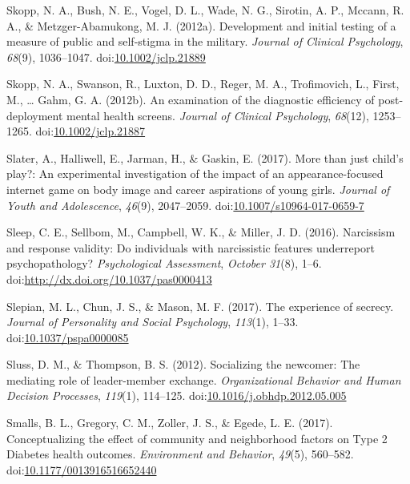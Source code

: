 \documentclass[english,man]{apa6}
\theoremstyle{definition}
\theoremstyle{definition}
\theoremstyle{definition}
\theoremstyle{remark}
\begin{document}
\hypertarget{ref-Skopp2012a}{}
Skopp, N. A., Bush, N. E., Vogel, D. L., Wade, N. G., Sirotin, A. P.,
Mccann, R. A., \& Metzger-Abamukong, M. J. (2012a). Development and
initial testing of a measure of public and self-stigma in the military.
\emph{Journal of Clinical Psychology}, \emph{68}(9), 1036--1047.
doi:\href{https://doi.org/10.1002/jclp.21889}{10.1002/jclp.21889}

\hypertarget{ref-Skopp2012}{}
Skopp, N. A., Swanson, R., Luxton, D. D., Reger, M. A., Trofimovich, L.,
First, M., \ldots{} Gahm, G. A. (2012b). An examination of the
diagnostic efficiency of post-deployment mental health screens.
\emph{Journal of Clinical Psychology}, \emph{68}(12), 1253--1265.
doi:\href{https://doi.org/10.1002/jclp.21887}{10.1002/jclp.21887}

\hypertarget{ref-Slater2017}{}
Slater, A., Halliwell, E., Jarman, H., \& Gaskin, E. (2017). More than
just child's play?: An experimental investigation of the impact of an
appearance-focused internet game on body image and career aspirations of
young girls. \emph{Journal of Youth and Adolescence}, \emph{46}(9),
2047--2059.
doi:\href{https://doi.org/10.1007/s10964-017-0659-7}{10.1007/s10964-017-0659-7}

\hypertarget{ref-Sleep2016}{}
Sleep, C. E., Sellbom, M., Campbell, W. K., \& Miller, J. D. (2016).
Narcissism and response validity: Do individuals with narcissistic
features underreport psychopathology? \emph{Psychological Assessment},
\emph{October 31}(8), 1--6.
doi:\href{https://doi.org/http://dx.doi.org/10.1037/pas0000413}{http://dx.doi.org/10.1037/pas0000413}

\hypertarget{ref-Slepian2017}{}
Slepian, M. L., Chun, J. S., \& Mason, M. F. (2017). The experience of
secrecy. \emph{Journal of Personality and Social Psychology},
\emph{113}(1), 1--33.
doi:\href{https://doi.org/10.1037/pspa0000085}{10.1037/pspa0000085}

\hypertarget{ref-Sluss2012}{}
Sluss, D. M., \& Thompson, B. S. (2012). Socializing the newcomer: The
mediating role of leader-member exchange. \emph{Organizational Behavior
and Human Decision Processes}, \emph{119}(1), 114--125.
doi:\href{https://doi.org/10.1016/j.obhdp.2012.05.005}{10.1016/j.obhdp.2012.05.005}

\hypertarget{ref-Smalls2017}{}
Smalls, B. L., Gregory, C. M., Zoller, J. S., \& Egede, L. E. (2017).
Conceptualizing the effect of community and neighborhood factors on Type
2 Diabetes health outcomes. \emph{Environment and Behavior},
\emph{49}(5), 560--582.
doi:\href{https://doi.org/10.1177/0013916516652440}{10.1177/0013916516652440}
\end{document}
